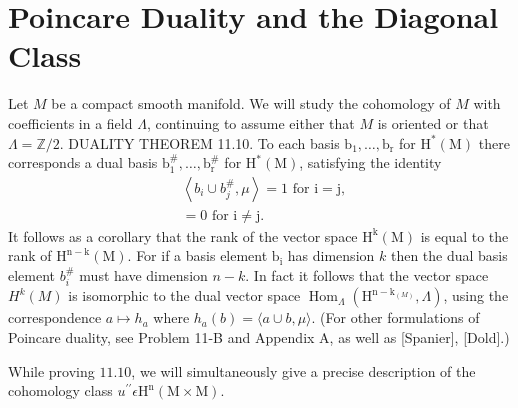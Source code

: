 \documentclass[10pt]{article}
\begin{document}
\section{Poincare Duality and the Diagonal Class}
Let $M$ be a compact smooth manifold. We will study the cohomology of $M$ with coefficients in a field $\Lambda$, continuing to assume either that $M$ is oriented or that $\Lambda=\mathbb{Z} / 2$. DUALITY THEOREM 11.10. To each basis $\mathrm{b}_{1}, \ldots, \mathrm{b}_{\mathrm{r}}$ for $\mathrm{H}^{*}(\mathrm{M})$ there corresponds a dual basis $\mathrm{b}_{1}^{\#}, \ldots, \mathrm{b}_{\mathrm{r}}^{\#}$ for $\mathrm{H}^{*}(\mathrm{M})$, satisfying the identity
$$
\begin{aligned}
& \left\langle b_{i} \cup b_{j}^{\#}, \mu\right\rangle=1 \text { for } \mathrm{i}=\mathrm{j} \text {, } \\
& =0 \text { for } \mathrm{i} \neq \mathrm{j} \text {. }
\end{aligned}
$$
It follows as a corollary that the rank of the vector space $\mathrm{H}^{\mathrm{k}}(\mathrm{M})$ is equal to the rank of $\mathrm{H}^{\mathrm{n}-\mathrm{k}}(\mathrm{M})$. For if a basis element $\mathrm{b}_{\mathrm{i}}$ has dimension $k$ then the dual basis element $b_{i}^{\#}$ must have dimension $n-k$. In fact it follows that the vector space $H^{k}(M)$ is isomorphic to the dual vector space $\operatorname{Hom}_{\Lambda}\left(\mathrm{H}^{\mathrm{n}-\mathrm{k}_{(M)}}, \Lambda\right)$, using the correspondence $a \mapsto h_{a}$ where $h_{a}(b)=\langle a \cup b, \mu\rangle$. (For other formulations of Poincare duality, see Problem 11-B and Appendix A, as well as [Spanier], [Dold].)

While proving $11.10$, we will simultaneously give a precise description of the cohomology class $u^{\prime \prime} \epsilon \mathrm{H}^{\mathrm{n}}(\mathrm{M} \times \mathrm{M})$.
\end{document}
